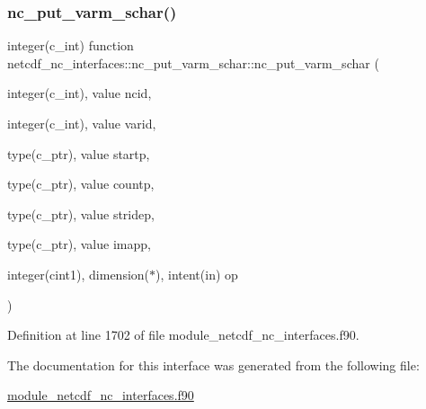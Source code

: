 \subsubsection{\texorpdfstring{nc\+\_\+put\+\_\+varm\+\_\+schar()}{nc\_put\_varm\_schar()}}
{\footnotesize\ttfamily integer(c\+\_\+int) function netcdf\+\_\+nc\+\_\+interfaces\+::nc\+\_\+put\+\_\+varm\+\_\+schar\+::nc\+\_\+put\+\_\+varm\+\_\+schar (\begin{DoxyParamCaption}\item[{integer(c\+\_\+int), value}]{ncid,  }\item[{integer(c\+\_\+int), value}]{varid,  }\item[{type(c\+\_\+ptr), value}]{startp,  }\item[{type(c\+\_\+ptr), value}]{countp,  }\item[{type(c\+\_\+ptr), value}]{stridep,  }\item[{type(c\+\_\+ptr), value}]{imapp,  }\item[{integer(cint1), dimension($\ast$), intent(in)}]{op }\end{DoxyParamCaption})}



Definition at line 1702 of file module\+\_\+netcdf\+\_\+nc\+\_\+interfaces.\+f90.



The documentation for this interface was generated from the following file\+:\begin{DoxyCompactItemize}
\item 
\hyperlink{module__netcdf__nc__interfaces_8f90}{module\+\_\+netcdf\+\_\+nc\+\_\+interfaces.\+f90}\end{DoxyCompactItemize}
